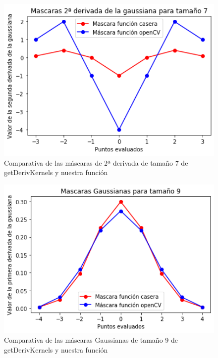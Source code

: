 \documentclass[12pt,spanish]{article}
\begin{document}
\begin{figure}[H]
	\centering
	\includegraphics[width=12cm]{./imagenes_memoria/2d_t7.png}
	\caption{Comparativa de las máscaras de 2ª derivada de tamaño 7 de getDerivKernels y nuestra función}
	\label{mask_2d_t7}
\end{figure}

\begin{figure}[H]
	\centering
	\includegraphics[width=12cm, scale=1]{./imagenes_memoria/1_t9.png}
	\caption{Comparativa de las máscaras Gaussianas de tamaño 9 de getDerivKernels y nuestra función}
	\label{mask_t9}
\end{figure}
\end{document}
